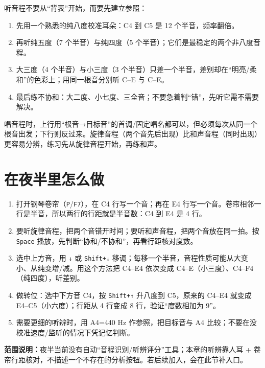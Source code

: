 听音程不要从“背表”开始，而要先建立参照：

\begin{enumerate}
  \item 先用一个熟悉的纯八度校准耳朵：C4 到 C5 是 12 个半音，频率翻倍。
  \item 再听纯五度（7 个半音）与纯四度（5 个半音）；它们是最稳定的两个非八度音程。
  \item 大三度（4 个半音）与小三度（3 个半音）只差一个半音，差别却在“明亮/柔和”的色彩上；用同一根音分别听 C–E 与 C–E\flatsym。
  \item 最后练不协和：大二度、小七度、三全音；不要急着判“错”，先听它需不需要解决。
\end{enumerate}

唱音程时，上行用“根音→目标音”的首调/固定唱名都可以，但必须每次从同一个根音出发；下行则反过来。旋律音程（两个音先后出现）比和声音程（同时出现）更容易分辨，练习先从旋律音程开始，再练和声。

\section{在夜半里怎么做}

\begin{enumerate}
  \item 打开钢琴卷帘（\texttt{P}/\texttt{F7}），在 C4 行写一个音；再在 E4 行写一个音。卷帘相邻一行是半音，所以两行的行距就是半音数：C4 到 E4 是 4 行。
  \item 要听旋律音程，把两个音错开时间；要听和声音程，把两个音放在同一拍。按 \texttt{Space} 播放，先判断“协和/不协和”，再看行距核对度数。
  \item 选中上方音，用 \texttt{↓} 或 \texttt{Shift+↓} 移调；每移一个半音，音程性质可能从大变小、从纯变增/减。用这个方法把 C4–E4 依次变成 C4–E（小三度）、C4–F4（纯四度），听差别。
  \item 做转位：选中下方音 C4，按 \texttt{Shift+↑} 升八度到 C5，原来的 C4–E4 就变成 E4–C5（小六度）；行距从 4 行变成 8 行，验证“度数相加为 9”。
  \item 需要更细的听辨时，用 A4=440 Hz 作参照，把目标音与 A4 比较；不要在没校准速度/监听的情况下凭记忆判断。
\end{enumerate}


\textbf{范围说明：}夜半当前没有自动“音程识别/听辨评分”工具；本章的听辨靠人耳 + 卷帘行距核对，不描述一个不存在的分析按钮。若后续加入，会在此节补入口。

